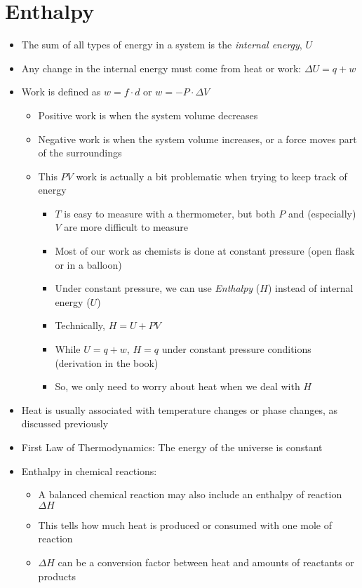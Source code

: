 \documentclass[12pt, openany, letterpaper]{memoir}
\begin{document}
\section{Enthalpy}
\begin{itemize}
  \item The sum of all types of energy in a system is the \emph{internal energy}, $U$
  \item Any change in the internal energy must come from heat or work: $\Delta U=q+w$
  \item Work is defined as $w=f\cdot d$ or $w=-P\cdot\Delta V$
    \begin{itemize}
      \item Positive work is when the system volume decreases
      \item Negative work is when the system volume increases, or a force moves part of the surroundings
      \item This $PV$ work is actually a bit problematic when trying to keep track of energy
        \begin{itemize}
		      \item $T$ is easy to measure with a thermometer, but both $P$ and (especially) $V$ are more difficult to measure
		      \item Most of our work as chemists is done at constant pressure (open flask or in a balloon)
		      \item Under constant pressure, we can use \emph{Enthalpy} ($H$) instead of internal energy ($U$)
          \item Technically, $H=U+PV$
		      \item While $U=q+w$, $H=q$ under constant pressure conditions (derivation in the book)
		      \item So, we only need to worry about heat when we deal with $H$
	      \end{itemize}
    \end{itemize}
	\item Heat is usually associated with temperature changes or phase changes, as discussed previously
	\item First Law of Thermodynamics: The energy of the universe is constant 
  \item Enthalpy in chemical reactions:
  \begin{itemize}
    \item A balanced chemical reaction may also include an enthalpy of reaction $\Delta H$
    \item This tells how much heat is produced or consumed with one mole of reaction
    \item $\Delta H$ can be a conversion factor between heat and amounts of reactants or products


\end{itemize}
\end{itemize}
\end{document}
